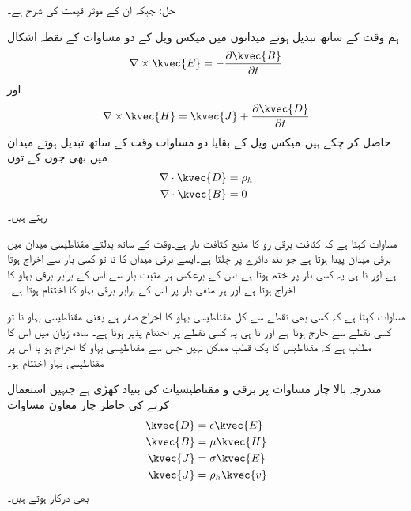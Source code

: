 حل: جبکہ ان کے موثر قیمت کی شرح   ہے۔


ہم وقت کے ساتھ تبدیل ہوتے میدانوں میں میکس ویل کے دو مساوات کے نقطہ اشکال
\begin{align}\label{مساوات-میکس_ویل_تفرقی_الف}
\nabla \times \kvec{E}=-\frac{\partial \kvec{B}}{\partial t}
\end{align}
اور
\begin{align}\label{مساوات-میکس_ویل_تفرقی_ب}
\nabla \times \kvec{H}=\kvec{J}+\frac{\partial \kvec{D}}{\partial t}
\end{align}
 حاصل کر چکے ہیں۔میکس ویل کے بقایا دو مساوات وقت کے ساتھ تبدیل ہوتے میدان میں بھی جوں کے توں
\begin{align}
\nabla \cdot \kvec{D}&=\rho_h \label{مساوات_میکس_ویل_گاوس_قانون_نقطہ}\\
\nabla \cdot \kvec{B}&=0 \label{مساوات_میکس_ویل_مقناطیسی_میدان_دو_قطب}
\end{align}
 رہتے ہیں۔ 

مساوات  کہتا ہے کہ کثافت برقی رو کا منبع کثافت بار  ہے۔وقت کے ساتھ بدلتے مقناطیسی میدان میں برقی میدان  پیدا ہوتا ہے جو بند دائرے پر چلتا ہے۔ایسے برقی میدان کا نا تو کسی بار سے اخراج ہوتا ہے اور نا ہی یہ کسی بار پر ختم ہوتا ہے۔اس کے برعکس ہر مثبت بار سے اس کے برابر برقی بہاو کا اخراج ہوتا ہے اور ہر منفی بار پر اس کے برابر برقی بہاو کا اختتام ہوتا ہے۔
  

مساوات  کہتا ہے کہ کسی بھی نقطے سے کل مقناطیسی بہاو کا اخراج صفر ہے یعنی مقناطیسی بہاو نا تو کسی نقطے سے خارج ہوتا ہے اور نا ہی یہ کسی نقطے پر اختتام پذیر ہوتا ہے۔ سادہ زبان میں اس کا مطلب ہے کہ مقناطیس کا یک قطب ممکن نہیں جس سے مقناطیسی بہاو کا اخراج ہو یا اس پر مقناطیسی بہاو اختتام ہو۔

مندرجہ بالا چار مساوات پر برقی و مقناطیسیات کی بنیاد کھڑی ہے جنہیں استعمال کرنے کی خاطر چار معاون مساوات
\begin{align}
\kvec{D}&=\epsilon \kvec{E} \label{مساوات_میکس_ویل_خالی_خلاء_برقی_مستقل}\\
\kvec{B}&=\mu \kvec{H} \label{مساوات_میکس_ویل_خالی_خلاء_مقناطیسی_مستقل}\\
\kvec{J}&=\sigma \kvec{E}\\
\kvec{J}&=\rho_h \kvec{v}
\end{align}
بھی درکار ہوتے ہیں۔


